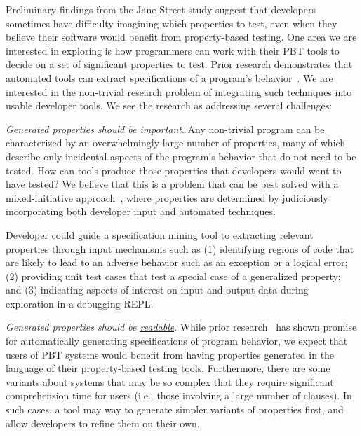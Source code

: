 
Preliminary findings from the Jane Street study suggest that developers sometimes have
difficulty imagining which properties to test, even when they believe their
software would benefit from property-based testing. One area we are interested
in exploring is how programmers can work with their PBT tools to decide on a set
of significant properties to test.  Prior research demonstrates that automated
tools can extract specifications of a program's
behavior~\cite{ammons2002mining,le2018deep,claessen2010quickspec}. We are
interested in the non-trivial research problem of integrating such techniques
into usable developer tools. We see the research as addressing several
challenges:

\textit{Generated properties should be \underline{important}}. Any non-trivial
program can be characterized by an overwhelmingly large number of properties,
many of which describe only incidental aspects of the program's behavior that do
not need to be tested. How can tools produce those properties that developers
would want to have tested? We believe that this is a problem that can be best
solved with a mixed-initiative approach~\cite{allen1999mixed}, where properties
are determined by judiciously incorporating both developer input and automated
techniques.

Developer could guide a specification mining tool to extracting relevant
properties through input mechanisms such as (1) identifying regions of code that
are likely to lead to an adverse behavior such as an exception or a logical
error; (2) providing unit test cases that test a special case of a generalized
property; and (3) indicating aspects of interest on input and output data during
exploration in a debugging REPL.

\textit{Generated properties should be \underline{readable}}. While prior research~\cite{claessen2010quickspec}
has shown promise for automatically generating specifications of program
behavior, we expect that users of PBT systems would benefit from having
properties generated in the language of their property-based testing tools.
Furthermore, there are some variants about systems that may be so complex that
they require significant comprehension time for users (i.e., those involving a
large number of clauses). In such cases, a tool may way to generate simpler
variants of properties first, and allow developers to refine them on their own.

